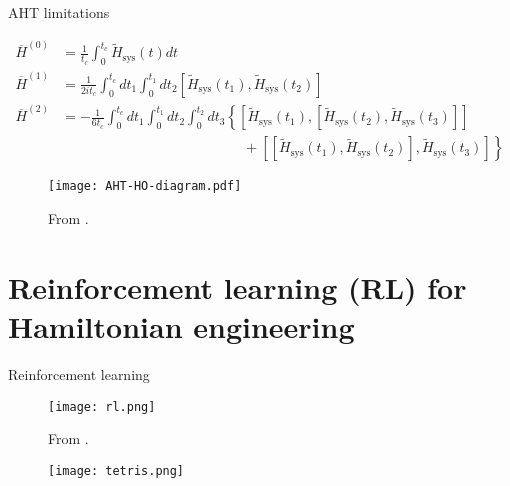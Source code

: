 \documentclass{beamer}
\begin{document}
\begin{frame}{AHT limitations}

{\scriptsize %
\begin{align*}
    \overline{H}^{(0)} &= \frac{1}{t_c} \int_0^{t_c}
        \widetilde{H}_{\text{sys}}(t) dt \\
    \overline{H}^{(1)} &= \frac{1}{2it_c} \int_0^{t_c} dt_1 \int_0^{t_1} dt_2
        \left[\widetilde{H}_{\text{sys}}(t_1), \widetilde{H}_{\text{sys}}(t_2)\right] \\
    \overline{H}^{(2)} &= -\frac{1}{6t_c}
    \int_0^{t_c} dt_1 \int_0^{t_1} dt_2 \int_0^{t_2} dt_3
    \left\{
    \left[\widetilde{H}_{\text{sys}}(t_1), \left[\widetilde{H}_{\text{sys}}(t_2), \widetilde{H}_{\text{sys}}(t_3)\right]\right] \right. \\
    & \hspace{13em} + \left.
    \left[\left[\widetilde{H}_{\text{sys}}(t_1), \widetilde{H}_{\text{sys}}(t_2)\right], \widetilde{H}_{\text{sys}}(t_3)\right]
    \right\}
\end{align*}
}
\vspace{-1em}
\begin{figure}
\centering
\texttt{[image: AHT-HO-diagram.pdf]}

{\scriptsize From \cite{brinkmann_2016}.}
\end{figure}


\end{frame}



\section{Reinforcement learning (RL) for Hamiltonian engineering}

\begin{frame}{Reinforcement learning}

\begin{figure}
\centering
\texttt{[image: rl.png]}

From \cite{sutton2018reinforcement}.
\end{figure}

\begin{figure}
\centering
\texttt{[image: tetris.png]}
\end{figure}

\end{frame}
\end{document}
